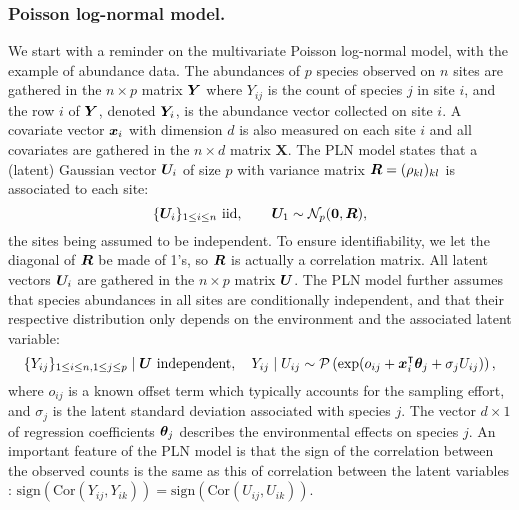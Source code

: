 \subsubsection*{Poisson log-normal model.} 
We start with a reminder on the multivariate Poisson log-normal model, with the example of abundance data. The abundances of $p$ species observed on $n$ sites are gathered in the $n \times p$ matrix ${\boldsymbol{Y}}$ where $Y_ {ij}$ is the count of species $j$ in site $i$, and the row $i$ of ${\boldsymbol{Y}}$, denoted ${\boldsymbol{Y}}_i$, is the abundance vector collected on site $i$. A covariate vector ${\boldsymbol{x}}_i $ with dimension $d$ is also measured on each site $i$ and all covariates are gathered in the $n \times d$ matrix  $\boldsymbol X$. The PLN model states that a (latent) Gaussian vector ${\boldsymbol{U}}_i$ of size $p$ with variance matrix ${\boldsymbol{R}} = (\rho_{kl})_{kl}$ is associated to each site:
\begin{equation} \label{eq:PLN-Z}
\{{\boldsymbol{U}}_i\}_{1 \leq i \leq n} \text{ iid}, \qquad 
{\boldsymbol{U}}_1 \sim {\mathcal{N}}_p({\boldsymbol{0}}, {\boldsymbol{R}}),
\end{equation}
the sites being assumed to be independent. To ensure identifiability, we let the diagonal of ${\boldsymbol{R}}$ be made of 1's, so ${\boldsymbol{R}}$ is actually a correlation matrix.
All latent vectors ${\boldsymbol{U}}_i$ are gathered in the $n \times p$ matrix ${\boldsymbol{U}}$. The PLN model further assumes that species abundances in all sites are conditionally independent, and that their respective distribution only depends on the environment and the associated latent variable:
\begin{equation} \label{eq:PLN-Y.Z}
\{Y_{ij}\}_{1 \leq i \leq n, 1 \leq j \leq p} \mid {\boldsymbol{U}} \text{ independent}, \quad 
Y_{ij} \mid U_{ij} \sim {\mathcal{P}}\left(\exp(o_{ij} + {\boldsymbol{x}}_i^\intercal {\boldsymbol{\theta}}_j + \sigma_j U_{ij})\right),
\end{equation}
where $o_{ij}$ is a known offset term which typically accounts for the sampling effort, and $\sigma_j$ is the latent standard deviation associated with species $j$. The vector $d \times 1$ of regression coefficients ${\boldsymbol{\theta}}_j$ describes the environmental effects on species $j$. An important feature of the PLN model is that the sign of the correlation between the observed counts is the same as this of correlation between the latent variables \citep{AiH89}: $\text{sign}(\text{Cor}(Y_{ij}, Y_{ik})) = \text{sign}(\text{Cor}(U_{ij}, U_{ik}))$. 

